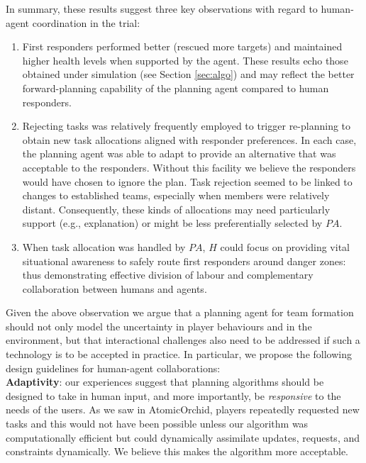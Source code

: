 In summary, these results suggest three key observations with regard to  human-agent coordination in the trial: 
\begin{enumerate}
\item First responders performed better (rescued more targets)  and maintained higher health levels when supported by the agent.  These results echo those obtained under simulation (see Section \ref{sec:algo}) and  may reflect the better forward-planning capability of the planning agent compared to human responders. 
 
\item Rejecting tasks was relatively frequently employed to trigger re-planning to obtain new task allocations aligned with responder preferences.  In each case, the planning agent was able to adapt to provide an alternative  that was acceptable to the responders. Without this facility we believe the responders would have chosen to ignore the plan. Task rejection seemed to be linked to changes to established teams, especially when members were relatively distant. Consequently, these kinds of allocations may need particularly support (e.g., explanation) or might be less preferentially selected by $PA$.

\item When task allocation was handled by $PA$, $H$ could focus on providing vital situational awareness to safely route first responders around danger zones: thus demonstrating effective division of labour and complementary collaboration between humans and agents.
\end{enumerate}

Given the above observation we argue that a planning agent for team formation should not only model the uncertainty in player behaviours and in the environment, but that interactional challenges also need to be addressed  if such a technology is to be accepted in practice. In particular, we propose the following design guidelines for human-agent collaborations:\\

\noindent \textbf{Adaptivity}: our experiences suggest that planning algorithms should be designed to take in human input, and more importantly, be \emph{responsive} to the needs of the users. As we saw in AtomicOrchid, players repeatedly requested new tasks and this would not have been possible unless our algorithm  was computationally efficient but could dynamically assimilate updates, requests, and constraints dynamically. We believe this makes the algorithm more acceptable.\\

